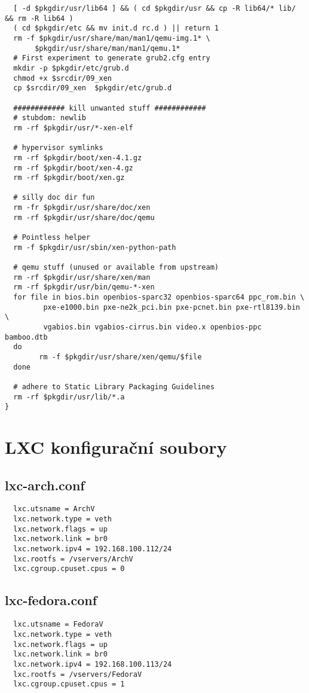 \begin{lstlisting}
  [ -d $pkgdir/usr/lib64 ] && ( cd $pkgdir/usr && cp -R lib64/* lib/ && rm -R lib64 )
  ( cd $pkgdir/etc && mv init.d rc.d ) || return 1
  rm -f $pkgdir/usr/share/man/man1/qemu-img.1* \
       $pkgdir/usr/share/man/man1/qemu.1*
  # First experiment to generate grub2.cfg entry
  mkdir -p $pkgdir/etc/grub.d
  chmod +x $srcdir/09_xen
  cp $srcdir/09_xen  $pkgdir/etc/grub.d

  ############ kill unwanted stuff ############
  # stubdom: newlib
  rm -rf $pkgdir/usr/*-xen-elf

  # hypervisor symlinks
  rm -rf $pkgdir/boot/xen-4.1.gz
  rm -rf $pkgdir/boot/xen-4.gz
  rm -rf $pkgdir/boot/xen.gz

  # silly doc dir fun
  rm -fr $pkgdir/usr/share/doc/xen
  rm -rf $pkgdir/usr/share/doc/qemu

  # Pointless helper
  rm -f $pkgdir/usr/sbin/xen-python-path

  # qemu stuff (unused or available from upstream)
  rm -rf $pkgdir/usr/share/xen/man
  rm -rf $pkgdir/usr/bin/qemu-*-xen
  for file in bios.bin openbios-sparc32 openbios-sparc64 ppc_rom.bin \
         pxe-e1000.bin pxe-ne2k_pci.bin pxe-pcnet.bin pxe-rtl8139.bin \
         vgabios.bin vgabios-cirrus.bin video.x openbios-ppc bamboo.dtb
  do
        rm -f $pkgdir/usr/share/xen/qemu/$file
  done

  # adhere to Static Library Packaging Guidelines
  rm -rf $pkgdir/usr/lib/*.a 	
}
\end{lstlisting}

\chapter{LXC konfigurační soubory}
\section{lxc-arch.conf}
\label{lxcarch}
\begin{verbatim}
  lxc.utsname = ArchV
  lxc.network.type = veth
  lxc.network.flags = up
  lxc.network.link = br0
  lxc.network.ipv4 = 192.168.100.112/24
  lxc.rootfs = /vservers/ArchV
  lxc.cgroup.cpuset.cpus = 0
\end{verbatim}
\section{lxc-fedora.conf}
\label{lxcfedora}
\begin{verbatim}
  lxc.utsname = FedoraV
  lxc.network.type = veth
  lxc.network.flags = up
  lxc.network.link = br0
  lxc.network.ipv4 = 192.168.100.113/24
  lxc.rootfs = /vservers/FedoraV
  lxc.cgroup.cpuset.cpus = 1
\end{verbatim}

